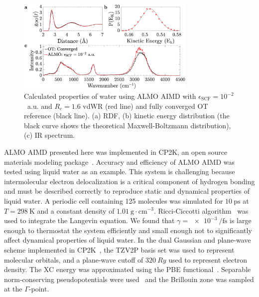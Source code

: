 \documentclass[aps,prl,reprint,amsmath,amssymb]{revtex4-1}
\begin{document}
\begin{figure}
\includegraphics[trim={1.3cm 0.1cm 3.3cm 1.3cm},clip,width=8.6cm]{Dynamical_Data_Tiled.eps}
\caption{\label{fig:dynproperties} 
Calculated properties of water using ALMO AIMD with $\epsilon_{\text{SCF}} = 10^{-2}$~a.u. and $R_{c} = 1.6$ vdWR (red line) and fully converged OT reference (black line).
(a) RDF, 
(b) kinetic energy distribution (the black curve shows the theoretical Maxwell-Boltzmann distribution), 
(c) IR spectrum.
}
\end{figure}

ALMO AIMD presented here was implemented in CP2K, an open source materials modeling package~\cite{www:cp2k}. 
Accuracy and efficiency of ALMO AIMD was tested using liquid water as an example. 
This system is challenging because intermolecular electron delocalization is a critical component of hydrogen bonding and must be described correctly to reproduce static and dynamical properties of liquid water. 
A periodic cell containing 125 molecules was simulated for $\SI{10}{\ps}$ at $T=\SI{298}{\K}$ and a constant density of $\SI{1.01}{\g\cdot\cm^{-3}}$. 
Ricci-Ciccotti algorithm~\cite{RZK:10.1080/0026897031000108113} was used to integrate the Langevin equation. We found that $\gamma = \SI{e-3}{\per\fs}$ is large enough to thermostat the system efficiently and small enough not to significantly affect dynamical properties of liquid water.
%
In the dual Gaussian and plane-wave scheme implemented in CP2K~\cite{a:quickstep}, the TZV2P basis set was used to represent molecular orbitals, and a plane-wave cutoff of $\SI{320}{Ry}$ used to represent electron density. 
The XC energy was approximated using the PBE functional~\cite{a:PBEfunctional}. 
Separable norm-conserving pseudopotentials were used~\cite{a:hgh} and the Brillouin zone was sampled at the $\Gamma$-point. 
\end{document}
